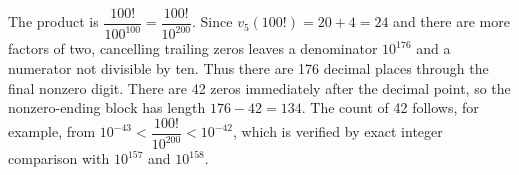 The product is $\dfrac{100!}{100^{100}}=\dfrac{100!}{10^{200}}$. Since $v_5(100!)=20+4=24$ and there are more factors of two, cancelling trailing zeros leaves a denominator $10^{176}$ and a numerator not divisible by ten. Thus there are 176 decimal places through the final nonzero digit. There are 42 zeros immediately after the decimal point, so the nonzero-ending block has length $176-42=\boxed{134}$. The count of 42 follows, for example, from $10^{-43}<\dfrac{100!}{10^{200}}<10^{-42}$, which is verified by exact integer comparison with $10^{157}$ and $10^{158}$.
